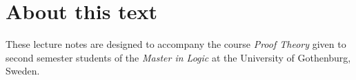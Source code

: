 \chapter{About this text}
\label{c-about}
%
These lecture notes are designed to accompany the course \emph{Proof Theory} given to second semester students of the \emph{Master in Logic} at the University of Gothenburg, Sweden.